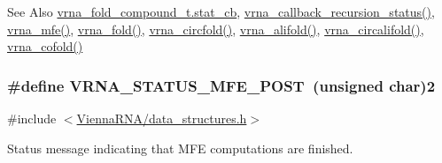 \begin{DoxySeeAlso}{See Also}
\hyperlink{group__fold__compound_a87a83f6795b569000efcbe65acc3dd81}{vrna\-\_\-fold\-\_\-compound\-\_\-t.\-stat\-\_\-cb}, \hyperlink{group__fold__compound_ga9fafb3f0217e27339bb9faf61a03e723}{vrna\-\_\-callback\-\_\-recursion\-\_\-status()}, \hyperlink{group__mfe__fold_gabd3b147371ccf25c577f88bbbaf159fd}{vrna\-\_\-mfe()}, \hyperlink{group__mfe__fold__single_gae7ca49ffb3086f145da36c964a7cec64}{vrna\-\_\-fold()}, \hyperlink{group__mfe__fold__single_gaa0f5bf321038f404b36a6147bdae4154}{vrna\-\_\-circfold()}, \hyperlink{group__consensus__mfe__fold_ga02098d0c8790f9a37fbef6ad0cfc705c}{vrna\-\_\-alifold()}, \hyperlink{group__consensus__mfe__fold_ga01ce2cff93ea44c4f4254760ca2bd16c}{vrna\-\_\-circalifold()}, \hyperlink{group__mfe__cofold_ga45515db181f17653ef7ef5487ef36d08}{vrna\-\_\-cofold()} 
\end{DoxySeeAlso}
\hypertarget{group__fold__compound_ga47c900ca76e56e59e2e83a06e0bde641}{
\subsubsection[{V\-R\-N\-A\-\_\-\-S\-T\-A\-T\-U\-S\-\_\-\-M\-F\-E\-\_\-\-P\-O\-S\-T}]{\setlength{\rightskip}{0pt plus 5cm}\#define V\-R\-N\-A\-\_\-\-S\-T\-A\-T\-U\-S\-\_\-\-M\-F\-E\-\_\-\-P\-O\-S\-T~(unsigned char)2}}\label{group__fold__compound_ga47c900ca76e56e59e2e83a06e0bde641}


{\ttfamily \#include $<$\hyperlink{data__structures_8h}{Vienna\-R\-N\-A/data\-\_\-structures.\-h}$>$}



Status message indicating that M\-F\-E computations are finished. 

